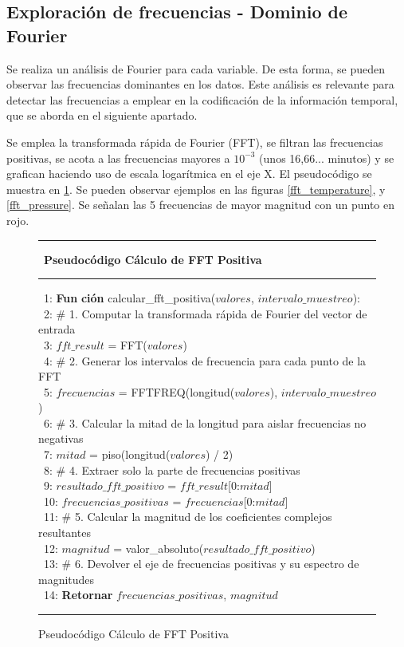 \subsection{Exploración de frecuencias - Dominio de Fourier}
Se realiza un análisis de Fourier para cada variable. De esta forma, se pueden observar las frecuencias dominantes en los datos. Este análisis
es relevante para detectar las frecuencias a emplear en la codificación de la información temporal, que se aborda en el siguiente apartado.

Se emplea la transformada rápida de Fourier (FFT), se filtran las frecuencias positivas, se acota a las frecuencias mayores a \(10^{-3}\) 
 (unos 16,66... minutos) y se grafican haciendo uso de escala logarítmica en el eje X. El pseudocódigo se muestra en \ref{fft_positive}. Se pueden observar ejemplos en las figuras \ref{fft_temperature},
 y \ref{fft_pressure}. Se señalan las 5 frecuencias de mayor magnitud con un punto en rojo. 

 \begin{figure}[H]
{\small
 \hrule \
 {\bf\small Pseudocódigo Cálculo de FFT Positiva}
 \hrule
\begin{center}
\begin{tabbing}
\ 1: {\bf Fun} \= {\bf ción} calcular\_fft\_positiva($valores$, $intervalo\_muestreo$): \\
\ 2: \> \# 1. Computar la transformada rápida de Fourier del vector de entrada \\
\ 3: \> $fft\_result$ = FFT($valores$)  \\
\ 4: \> \# 2. Generar los intervalos de frecuencia para cada punto de la FFT \\
\ 5: \> $frecuencias$ = FFTFREQ(longitud($valores$), $intervalo\_muestreo$)  \\
\ 6: \> \# 3. Calcular la mitad de la longitud para aislar frecuencias no negativas \\
\ 7: \> $mitad$ = piso(longitud($valores$) / 2)  \\
\ 8: \> \# 4. Extraer solo la parte de frecuencias positivas \\
\ 9: \> $resultado\_fft\_positivo$ = $fft\_result$[0:$mitad$]  \\
\ 10: \> $frecuencias\_positivas$ = $frecuencias$[0:$mitad$]  \\
\ 11: \> \# 5. Calcular la magnitud de los coeficientes complejos resultantes \\
\ 12: \> $magnitud$ = valor\_absoluto($resultado\_fft\_positivo$)  \\
\ 13: \> \# 6. Devolver el eje de frecuencias positivas y su espectro de magnitudes \\
\ 14: \> {\bf Retornar} $frecuencias\_positivas$, $magnitud$  \\
\end{tabbing}
\end{center}
\hrule
}
\caption{Pseudocódigo Cálculo de FFT Positiva}
\label{fft_positive}
\end{figure}


